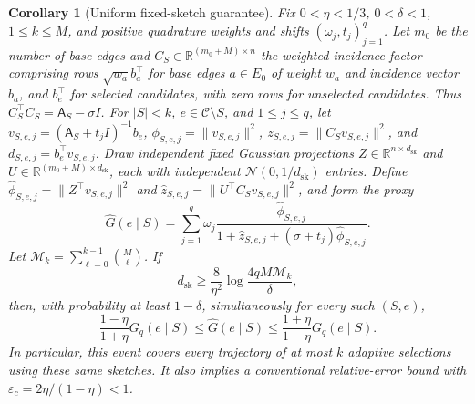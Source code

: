 \documentclass[conference]{IEEEtran}
\newtheorem{corollary}{Corollary}
\theoremstyle{definition}
\newcommand{\dsk}{d_{\mathrm{sk}}}
\newcommand{\matA}{\mathsf A}
\begin{document}
\begin{corollary}[Uniform fixed-sketch guarantee]
\label{cor:uniform-sketch}
Fix $0<\eta<1/3$, $0<\delta<1$, $1\le k\le M$, and positive
quadrature weights and shifts $(\omega_j,t_j)_{j=1}^q$.
Let $m_0$ be the number of base edges and
$C_S\in\mathbb R^{(m_0+M)\times n}$ the weighted incidence
factor comprising rows $\sqrt{w_a}b_a^\top$ for base edges
$a\in E_0$ of weight $w_a$ and incidence vector $b_a$, and
$b_e^\top$ for selected candidates, with zero rows for
unselected candidates. Thus $C_S^\top C_S=\matA_S-\sigma I$.
For $|S|<k$, $e\in\mathcal C\setminus S$, and $1\le j\le q$, let
$v_{S,e,j}=(\matA_S+t_jI)^{-1}b_e$,
$\phi_{S,e,j}=\|v_{S,e,j}\|^2$,
$z_{S,e,j}=\|C_Sv_{S,e,j}\|^2$, and
$d_{S,e,j}=b_e^\top v_{S,e,j}$. Draw independent fixed
Gaussian projections $Z\in\mathbb R^{n\times \dsk}$ and
$U\in\mathbb R^{(m_0+M)\times \dsk}$, each with independent
$\mathcal N(0,1/\dsk)$ entries. Define
$\widehat \phi_{S,e,j}=\|Z^\top v_{S,e,j}\|^2$ and
$\widehat z_{S,e,j}=\|U^\top C_Sv_{S,e,j}\|^2$, and form the proxy
\begin{equation}
\widehat G(e\mid S)=\sum_{j=1}^q\omega_j
\frac{\widehat \phi_{S,e,j}}
{1+\widehat z_{S,e,j}+(\sigma+t_j)\widehat \phi_{S,e,j}}.
\label{eq:uniform-sketch-score}
\end{equation}
Let $\mathcal M_k=\sum_{\ell=0}^{k-1}\binom M\ell$.
If
\begin{equation}
\dsk\ge\frac8{\eta^2}\log\frac{4q M\mathcal M_k}{\delta},
\label{eq:uniform-sketch-dimension}
\end{equation}
then, with probability at least $1-\delta$, simultaneously for every such $(S,e)$,
\begin{equation}
\frac{1-\eta}{1+\eta}G_q(e\mid S)
\le\widehat G(e\mid S)
\le\frac{1+\eta}{1-\eta}G_q(e\mid S).
\label{eq:uniform-sketch-comparison}
\end{equation}
In particular, this event covers every trajectory of at most $k$ adaptive selections using these same sketches.
It also implies a conventional relative-error bound with
$\varepsilon_c=2\eta/(1-\eta)<1$.
\end{corollary}
\end{document}
